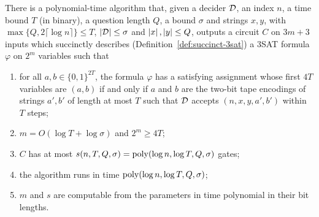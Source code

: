 \begin{theorem}
\label{thm:succinct-sat}
\leanok
There is a polynomial-time algorithm that, given a decider $\mathcal{D}$, an index $n$, a
time bound $T$ (in binary), a question length $Q$, a bound $\sigma$ and strings $x, y$, with
$\max\{Q, 2\lceil \log n \rceil\} \leq T$, $\left\vert {\mathcal{D}} \right\vert \leq \sigma$ and $\left\vert {x} \right\vert,
\left\vert {y} \right\vert \leq Q$, outputs a circuit $C$ on $3m + 3$ inputs which succinctly describes
(Definition~\ref{def:succinct-3sat}) a 3SAT formula $\varphi$ on $2^m$ variables such that
\begin{enumerate}
\item for all $a, b \in \{0,1\}^{2T}$, the formula $\varphi$ has a satisfying assignment
  whose first $4T$ variables are $(a, b)$ if and only if $a$ and $b$ are the two-bit tape
  encodings of strings $a', b'$ of length at most $T$ such that $\mathcal{D}$ accepts $(n, x,
  y, a', b')$ within $T$ steps;
\item $m = O(\log T + \log \sigma)$ and $2^m \geq 4T$;
\item $C$ has at most $s(n, T, Q, \sigma) = \mathrm{poly}(\log n, \log T, Q, \sigma)$ gates;
\item the algorithm runs in time $\mathrm{poly}(\log n, \log T, Q, \sigma)$;
\item $m$ and $s$ are computable from the parameters in time polynomial in their bit
  lengths.
\end{enumerate}
\end{theorem}

